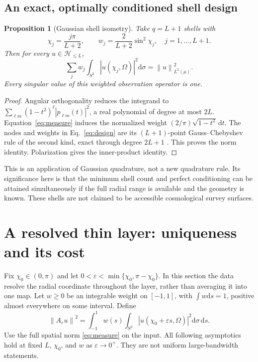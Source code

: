 \documentclass[aps,prd,reprint,amsmath,amssymb,nofootinbib,
longbibliography]{revtex4-2}
\newtheorem{proposition}[theorem]{Proposition}
\newcommand{\HH}{\mathcal H}
\newcommand{\dd}{\mathrm d}
\newcommand{\ee}{\varepsilon}
\newcommand{\norm}[1]{\left\lVert#1\right\rVert}
\begin{document}
\subsection{An exact, optimally conditioned shell design}

\begin{proposition}[Gaussian shell isometry]
\label{prop:isometry}
Take $q=L+1$ shells with
\begin{equation}
 \chi_j=\frac{j\pi}{L+2},\qquad
 w_j=\frac{2}{L+2}\sin^2\chi_j,
 \quad j=1,\ldots,L+1.
 \label{eq:design}
\end{equation}
Then for every $u\in\HH_{\leq L}$,
\begin{equation}
 \sum_j w_j\int_{S^2}|u(\chi_j,\Omega)|^2\dd\sigma
 =\norm{u}_{L^2(\mu)}^2 .
 \label{eq:isometry}
\end{equation}
Every singular value of this weighted observation operator is one.
\end{proposition}

\begin{proof}
Angular orthogonality reduces the integrand to
$\sum_{\ell m}(1-t^2)^\ell|p_{\ell m}(t)|^2$, a real polynomial of degree
at most $2L$. Equation~\eqref{eq:measure} induces the normalized weight
$(2/\pi)\sqrt{1-t^2}\,\dd t$. The nodes and weights in
Eq.~\eqref{eq:design} are its $(L+1)$-point Gauss--Chebyshev rule of the
second kind, exact through degree $2L+1$ \cite{DLMFQuad}. This proves
the norm identity. Polarization gives the inner-product identity.
\end{proof}

This is an application of Gaussian quadrature, not a new quadrature rule.
Its significance here is that the minimum shell count and perfect
conditioning can be attained simultaneously if the full radial range is
available and the geometry is known. These shells are not claimed to be
accessible cosmological survey surfaces.

\section{A resolved thin layer: uniqueness and its cost}
\label{sec:thin}

Fix $\chi_0\in(0,\pi)$ and let
$0<\ee<\min\{\chi_0,\pi-\chi_0\}$. In this section the data resolve
the radial coordinate throughout the layer, rather than averaging it
into one map. Let $w\geq0$ be an integrable weight on $[-1,1]$, with
$\int w\dd s=1$, positive almost everywhere on some interval. Define
\begin{equation}
 \norm{A_\ee u}^2=
 \int_{-1}^1 w(s)\int_{S^2}
 |u(\chi_0+\ee s,\Omega)|^2\dd\sigma\,\dd s.
 \label{eq:layernorm}
\end{equation}
Use the full spatial norm \eqref{eq:measure} on the input.
All following asymptotics hold at fixed $L$, $\chi_0$, and $w$ as
$\ee\to0^+$. They are not uniform large-bandwidth statements.
\end{document}
